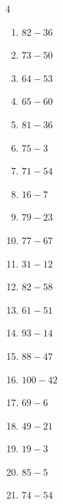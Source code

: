 \begin{multicols}{4}
\begin{enumerate}
  \item $82-36$
        \phantom{$=46$}

  \item $73-50$
        \phantom{$=23$}

  \item $64-53$
        \phantom{$=11$}

  \item $65-60$
        \phantom{$=5$}

  \item $81-36$
        \phantom{$=45$}

  \item $75-3$
        \phantom{$=72$}

  \item $71-54$
        \phantom{$=17$}

  \item $16-7$
        \phantom{$=9$}

  \item $79-23$
        \phantom{$=56$}

  \item $77-67$
        \phantom{$=10$}

  \item $31-12$
        \phantom{$=19$}

  \item $82-58$
        \phantom{$=24$}

  \item $61-51$
        \phantom{$=10$}

\columnbreak %

\resetques

  \item $93-14$
        \phantom{$=79$}

  \item $88-47$
        \phantom{$=41$}

  \item $100-42$
        \phantom{$=58$}

  \item $69-6$
        \phantom{$=63$}

  \item $49-21$
        \phantom{$=28$}

  \item $19-3$
        \phantom{$=16$}

  \item $85-5$
        \phantom{$=80$}

  \item $74-54$
        \phantom{$=20$}


\end{enumerate}
\end{multicols}

